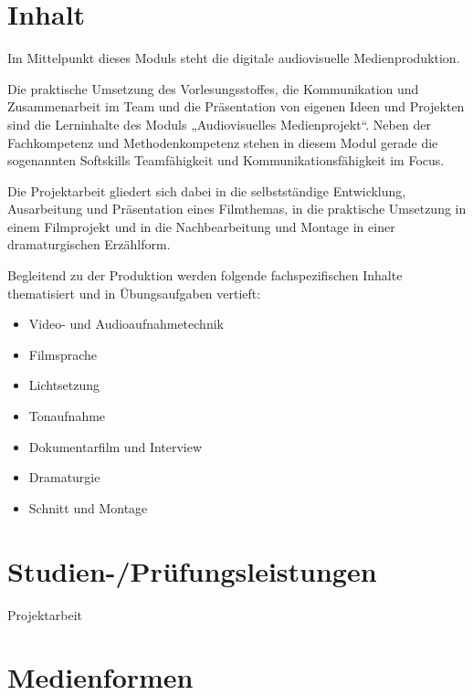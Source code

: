 \section*{Inhalt\label{/mi-2017/modulbeschreibungen-bachelor/BA_AVM}}\label{inhaltpathlabelmi-2017modulbeschreibungen-bachelorbaux5favm}

Im Mittelpunkt dieses Moduls steht die digitale audiovisuelle
Medienproduktion.

Die praktische Umsetzung des Vorlesungsstoffes, die Kommunikation und
Zusammenarbeit im Team und die Präsentation von eigenen Ideen und
Projekten sind die Lerninhalte des Moduls „Audiovisuelles
Medienprojekt``. Neben der Fachkompetenz und Methodenkompetenz stehen in
diesem Modul gerade die sogenannten Softskills Teamfähigkeit und
Kommunikationsfähigkeit im Focus.

Die Projektarbeit gliedert sich dabei in die selbstständige Entwicklung,
Ausarbeitung und Präsentation eines Filmthemas, in die praktische
Umsetzung in einem Filmprojekt und in die Nachbearbeitung und Montage in
einer dramaturgischen Erzählform.

Begleitend zu der Produktion werden folgende fachspezifischen Inhalte
thematisiert und in Übungsaufgaben vertieft:

\begin{itemize}
\tightlist
\item
  Video- und Audioaufnahmetechnik
\item
  Filmsprache
\item
  Lichtsetzung
\item
  Tonaufnahme
\item
  Dokumentarfilm und Interview
\item
  Dramaturgie
\item
  Schnitt und Montage
\end{itemize}

\section*{Studien-/Prüfungsleistungen\label{/mi-2017/modulbeschreibungen-bachelor/BA_AVM}}\label{studien-pruxfcfungsleistungenpathlabelmi-2017modulbeschreibungen-bachelorbaux5favm}

Projektarbeit

\section*{Medienformen\label{/mi-2017/modulbeschreibungen-bachelor/BA_AVM}}\label{medienformenpathlabelmi-2017modulbeschreibungen-bachelorbaux5favm}

